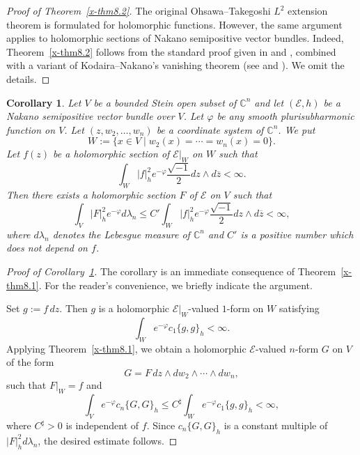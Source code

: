 \documentclass[12pt,twoside]{amsart}
\newtheorem{cor}[thm]{Corollary}
\theoremstyle{definition}
\begin{document}
\begin{proof}[Proof of Theorem~\ref{x-thm8.2}]
The original Ohsawa--Takegoshi $L^2$ extension theorem is formulated 
for holomorphic functions. 
However, the same argument applies to holomorphic sections of 
Nakano semipositive vector bundles. 
Indeed, Theorem~\ref{x-thm8.2} follows from the standard proof 
given in \cite{ohsawa-takegoshi} and \cite[2 Proof of 
Theorem 0.2]{ohsawaIII}, 
combined with a variant of Kodaira--Nakano's vanishing 
theorem (see \cite[Theorem 1.7]{ohsawaIII} and 
\cite[Theorem 5]{ohsawa-v}). 
We omit the details.
\end{proof}

\begin{cor}\label{x-cor8.3}
Let $V$ be a bounded Stein open subset of $\mathbb C^n$ and 
let $(\mathcal E, h)$ be a Nakano semipositive vector bundle 
over $V$. 
Let $\varphi$ be any smooth plurisubharmonic function on $V$. 
Let $(z, w_2, \ldots, w_n)$ be a coordinate system of $\mathbb C^n$. 
We put 
\[
W:=\{x\in V\mid w_2(x)=\cdots =w_n(x)=0\}. 
\] 
Let $f(z)$ be a holomorphic section of $\mathcal E|_W$ on $W$ such that 
\[
\int _W |f|^2_h e^{-\varphi} \frac{\sqrt{-1}}{2} dz\wedge d\overline{z}<\infty. 
\] 
Then there exists a holomorphic section $F$ of $\mathcal E$ on $V$ such that 
\[
\int _V |F|^2_h e^{-\varphi} d\lambda_n \leq C' 
\int _W |f|^2_h e^{-\varphi} \frac{\sqrt{-1}}{2} dz\wedge d\overline{z}<\infty, 
\] 
where $d\lambda_n$ denotes the Lebesgue measure of $\mathbb C^n$ and 
$C'$ is a positive number which does not depend on $f$. 
\end{cor}

\begin{proof}[Proof of Corollary~\ref{x-cor8.3}]
The corollary is an immediate consequence of 
Theorem~\ref{x-thm8.1}. 
For the reader's convenience, we briefly indicate the argument.

Set $g := f\,dz$. 
Then $g$ is a holomorphic $\mathcal E|_W$-valued $1$-form on $W$ satisfying
\[
\int_W e^{-\varphi} c_1 \{g, g\}_h < \infty.
\]
Applying Theorem~\ref{x-thm8.1}, we obtain a holomorphic 
$\mathcal E$-valued $n$-form $G$ on $V$ of the form
\[
G = F\, dz \wedge dw_2 \wedge \cdots \wedge dw_n,
\]
such that $F|_W = f$ and
\[
\int_V e^{-\varphi} c_n \{G, G\}_h
\le C^\sharp \int_W e^{-\varphi} c_1 \{g, g\}_h < \infty,
\]
where $C^\sharp>0$ is independent of $f$.
Since $c_n \{G, G\}_h$ is a constant multiple of 
$|F|_h^2 d\lambda_n$, the desired estimate follows.
\end{proof}
\end{document}
